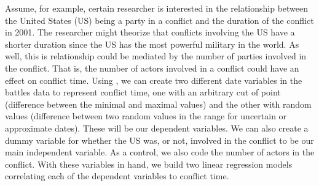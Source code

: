 \documentclass[
]{jss}
\begin{document}
Assume, for example, certain researcher is interested in the
relationship between the United States (US) being a party in a conflict
and the duration of the conflict in 2001. The researcher might theorize
that conflicts involving the US have a shorter duration since the US has
the most powerful military in the world. As well, this is relationship
could be mediated by the number of parties involved in the conflict.
That is, the number of actors involved in a conflict could have an
effect on conflict time. Using , we can create two
different date variables in the battles data to represent conflict time,
one with an arbitrary cut of point (difference between the minimal and
maximal values) and the other with random values (difference between two
random values in the range for uncertain or approximate dates). These
will be our dependent variables. We can also create a dummy variable for
whether the US was, or not, involved in the conflict to be our main
independent variable. As a control, we also code the number of actors in
the conflict. With these variables in hand, we build two linear
regression models correlating each of the dependent variables to
conflict time.
\end{document}
